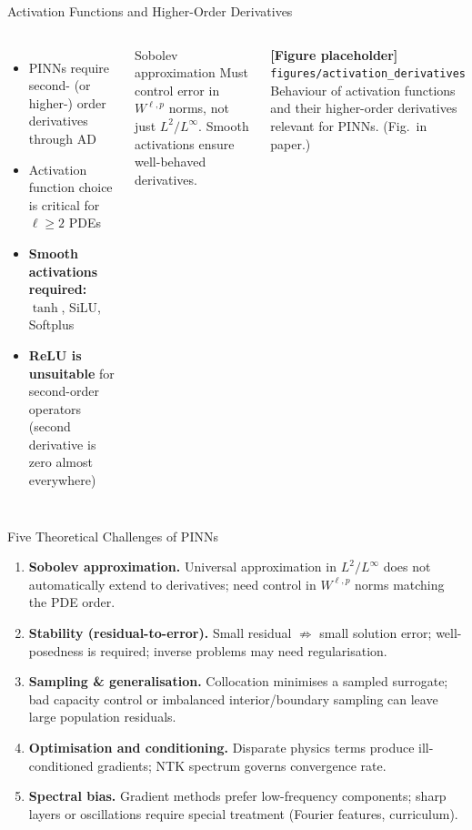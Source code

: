 \documentclass[aspectratio=169,10pt]{beamer}
\newcommand{\figph}[2]{%
  \par\smallskip
  \noindent\colorbox{gray!10}{\parbox{0.88\linewidth}{%
    \centering\smallskip
    \textbf{\color{gray!70}[Figure placeholder]}\\[3pt]%
    {\footnotesize\color{gray!60}\nolinkurl{#1}}\\[3pt]%
    {\small\color{gray!60}#2}\smallskip}}%
  \par\smallskip}
\begin{document}
\begin{frame}{Activation Functions and Higher-Order Derivatives}
  \begin{columns}[T]
      \begin{itemize}
        \item PINNs require second- (or higher-) order derivatives through AD
        \item Activation function choice is critical for $\ell \ge 2$ PDEs
        \item \textbf{Smooth activations required:} $\tanh$, SiLU, Softplus
        \item \textbf{ReLU is unsuitable} for second-order operators
              (second derivative is zero almost everywhere)
      \end{itemize}
      \vspace{0.3cm}
      \begin{alertblock}{Sobolev approximation}
        Must control error in $W^{\ell,p}$ norms, not just $L^2/L^\infty$.
        Smooth activations ensure well-behaved derivatives.
      \end{alertblock}
      \centering
      \figph{figures/activation_derivatives}{Behaviour of activation
        functions and their higher-order derivatives relevant for PINNs.
        (Fig.~in paper.)}
  \end{columns}
\end{frame}

\begin{frame}{Five Theoretical Challenges of PINNs}
  \begin{enumerate}\itemsep4pt
    \item \textbf{Sobolev approximation.}
          Universal approximation in $L^2/L^\infty$ does not automatically
          extend to derivatives; need control in $W^{\ell,p}$ norms matching
          the PDE order.

    \item \textbf{Stability (residual-to-error).}
          Small residual $\not\Rightarrow$ small solution error; well-posedness
          is required; inverse problems may need regularisation.

    \item \textbf{Sampling \& generalisation.}
          Collocation minimises a sampled surrogate; bad capacity control or
          imbalanced interior/boundary sampling can leave large population
          residuals.

    \item \textbf{Optimisation and conditioning.}
          Disparate physics terms produce ill-conditioned gradients; NTK
          spectrum governs convergence rate.

    \item \textbf{Spectral bias.}
          Gradient methods prefer low-frequency components; sharp layers or
          oscillations require special treatment (Fourier features, curriculum).
  \end{enumerate}
\end{frame}
\end{document}
